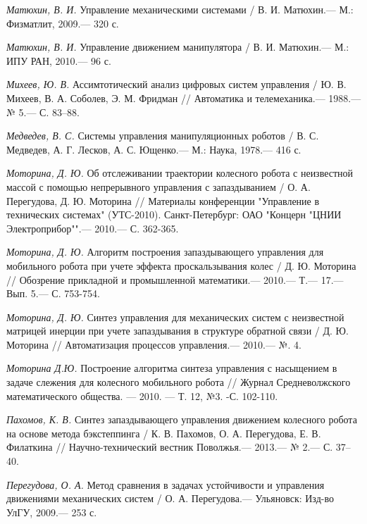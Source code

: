 \begin{thebibliography}{10}
	{\it Матюхин, В. И.} Управление механическими системами / В. И. Матюхин.— М.: Физматлит,
	2009.— 320 с.
	
	{\it Матюхин, В. И.} Управление движением манипулятора / В. И. Матюхин.— М.: ИПУ
	РАН, 2010.— 96 с.
	
	{\it Михеев, Ю. В.} Ассимтотический анализ цифровых систем управления / Ю. В. Михеев, В. А. Соболев, Э. М. Фридман // Автоматика и телемеханика.— 1988.— № 5.— С. 83–88.
	
	{\it Медведев, В. С.} Системы управления манипуляционных роботов / В. С. Медведев,
	А. Г. Лесков, А. С. Ющенко.— М.: Наука, 1978.— 416 с.
	
	{\it Моторина, Д. Ю.} Об отслеживании траектории колесного робота с неизвестной массой с помощью непрерывного управления с запаздыванием / О. А. Перегудова, Д. Ю. Моторина // Материалы конференции "Управление в технических системах" (УТС-2010). Санкт-Петербург: ОАО "Концерн "ЦНИИ Электроприбор"".—  2010.— С. 362-365.
	
	{\it Моторина, Д. Ю.} Алгоритм построения запаздывающего управления для мобильного робота при учете эффекта проскальзывания колес / Д. Ю. Моторина // Обозрение прикладной и промышленной математики.—  2010.— Т.— 17.— Вып. 5.— С. 753-754.
	
	{\it Моторина, Д. Ю.} Синтез управления для механических систем с неизвестной матрицей инерции при учете запаздывания в структуре обратной связи / Д. Ю. Моторина // Автоматизация процессов управления.—  2010.— №. 4.
	
	{\it Моторина Д.Ю.} Построение алгоритма синтеза управления с насыщением в задаче слежения для колесного мобильного робота // Журнал Средневолжского математического общества. — 2010. — Т. 12, №3. -С. 102-110.
	
	
	{\it Пахомов, К. В.} Синтез запаздывающего управления движением колесного робота на основе метода бэкстеппинга /
	К. В. Пахомов, О. А. Перегудова, Е. В. Филаткина // Научно-технический вестник Поволжья.— 2013.— № 2.— С. 37–40.
	
	{\it Перегудова, О. А.} Метод сравнения в задачах устойчивости и управления движениями
	механических систем / О. А. Перегудова.— Ульяновск: Изд-во УлГУ, 2009.— 253 с.
	

\end{thebibliography}
